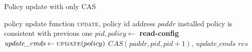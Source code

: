 \documentclass[conference]{sigcomm-alternate}
\newcommand{\hide}[1]{}
\newcommand{\paddr}{\textit{paddr}\xspace}
\newcommand{\pid}{\textit{pid}\xspace}
\newcommand{\ufunc}{update} %
\newcommand{\liron}[1]{\textit{\textcolor{mygreen}{[liron]: #1}}} %
\newcommand{\petr}[1]{\textit{\textcolor{blue}{[petr]: #1}}} %
\newcommand{\ack}{\textit{ack}}
\begin{document}


{\small
\begin{algorithm}[t]
    \caption{Policy update with only CAS}
    \label{alg:simple-update}
    \begin{algorithmic}[1]
    \Require policy update function \textsc{\ufunc}, policy id address $\paddr$
    \Ensure installed policy is consistent with previous one
 		\Repeat
 			\State $\pid,\textit{policy}\gets$ \textbf{read-config} %
 			\State $\textit{update\_cmds}\gets \textsc{\ufunc}(policy)$
 			\startTxn
	 			\State $CAS(\paddr,\pid,\pid+1)$,
	 			\State $\textit{update\_cmds}$ %
 			\endTxn
     	\Until{$\textit{res}=\ack$}
			\Return $\textit{res}$

    \end{algorithmic}
\end{algorithm}
}

%
\hide{
It takes a set of rules $U$ (not yet a policy)and proceeds as follows: first, we seek to
 obtain a unique \emph{id}. FIXME: to be continued...
 \textbf{LS: I am not sure if I need to tell every step of the story or maybe it best to explain the main dif from the previous one similarly to what I just wrote next}.
}
%

\end{document}
